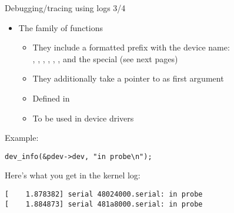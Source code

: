 \begin{frame}[fragile]{Debugging/tracing using logs 3/4}
  \begin{itemize}
  \item The  family of functions
    \begin{itemize}
    \item They include a formatted prefix with the device
      name:\\ , , ,
      , , , 
      and the special  (see next pages)
    \item They additionally take a pointer to  as first
      argument
    \item Defined in 
    \item To be used in device drivers
    \end{itemize}
  \end{itemize}
  Example:
  \begin{verbatim}
dev_info(&pdev->dev, "in probe\n");
  \end{verbatim}
  Here's what you get in the kernel log:
\begin{verbatim}
[    1.878382] serial 48024000.serial: in probe
[    1.884873] serial 481a8000.serial: in probe
\end{verbatim}
\end{frame}

